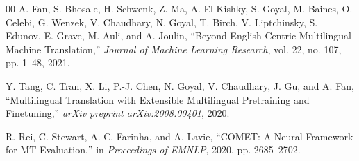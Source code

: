 \documentclass[conference]{IEEEtran}
\begin{document}
\begin{thebibliography}{00}
A. Fan, S. Bhosale, H. Schwenk, Z. Ma, A. El-Kishky,
S. Goyal, M. Baines, O. Celebi, G. Wenzek,
V. Chaudhary, N. Goyal, T. Birch, V. Liptchinsky,
S. Edunov, E. Grave, M. Auli, and A. Joulin,
``Beyond English-Centric Multilingual Machine Translation,''
\textit{Journal of Machine Learning Research},
vol. 22, no. 107, pp. 1--48, 2021.

Y. Tang, C. Tran, X. Li, P.-J. Chen, N. Goyal,
V. Chaudhary, J. Gu, and A. Fan,
``Multilingual Translation with Extensible Multilingual
Pretraining and Finetuning,''
\textit{arXiv preprint arXiv:2008.00401}, 2020.

R. Rei, C. Stewart, A. C. Farinha, and A. Lavie,
``COMET: A Neural Framework for MT Evaluation,''
in \textit{Proceedings of EMNLP}, 2020,
pp. 2685--2702.

\end{thebibliography}
\end{document}
